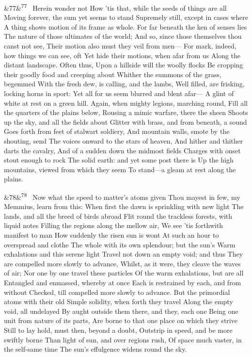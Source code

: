 \documentclass[12pt]{article}
\newcommand{\para}[1][]{\par\noindent\ifx&#1&\else\textsuperscript{\footnotesize #1}~\fi}
\begin{document}
\para[77] Herein wonder not How 'tis that, while the seeds of things are all Moving forever, the sum yet seems to stand Supremely still, except in cases where A thing shows motion of its frame as whole. For far beneath the ken of senses lies The nature of those ultimates of the world; And so, since those themselves thou canst not see, Their motion also must they veil from men--- For mark, indeed, how things we can see, oft Yet hide their motions, when afar from us Along the distant landscape. Often thus, Upon a hillside will the woolly flocks Be cropping their goodly food and creeping about Whither the summons of the grass, begemmed With the fresh dew, is calling, and the lambs, Well filled, are frisking, locking horns in sport: Yet all for us seem blurred and blent afar--- A glint of white at rest on a green hill. Again, when mighty legions, marching round, Fill all the quarters of the plains below, Rousing a mimic warfare, there the sheen Shoots up the sky, and all the fields about Glitter with brass, and from beneath, a sound Goes forth from feet of stalwart soldiery, And mountain walls, smote by the shouting, send The voices onward to the stars of heaven, And hither and thither darts the cavalry, And of a sudden down the midmost fields Charges with onset stout enough to rock The solid earth: and yet some post there is Up the high mountains, viewed from which they seem To stand---a gleam at rest along the plains.

\para[78] Now what the speed to matter's atoms given Thou mayest in few, my Memmius, learn from this: When first the dawn is sprinkling with new light The lands, and all the breed of birds abroad Flit round the trackless forests, with liquid notes Filling the regions along the mellow air, We see 'tis forthwith manifest to man How suddenly the risen sun is wont At such an hour to overspread and clothe The whole with its own splendour; but the sun's Warm exhalations and this serene light Travel not down an empty void; and thus They are compelled more slowly to advance, Whilst, as it were, they cleave the waves of air; Nor one by one travel these particles Of the warm exhalations, but are all Entangled and enmassed, whereby at once Each is restrained by each, and from without Checked, till compelled more slowly to advance. But the primordial atoms with their old Simple solidity, when forth they travel Along the empty void, all undelayed By aught outside them there, and they, each one Being one unit from nature of its parts, Are borne to that one place on which they strive Still to lay hold, must then, beyond a doubt, Outstrip in speed, and be more swiftly borne Than light of sun, and over regions rush, Of space much vaster, in the self-same time The sun's effulgence widens round the sky.
\end{document}
